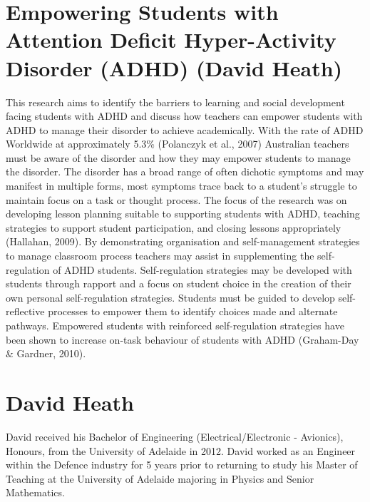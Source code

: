 \documentclass[twoside,12pt,a4paper,notitlepage]{memoir}
\begin{document}
\pagebreak
\section*{Empowering Students with Attention Deficit Hyper-Activity Disorder (ADHD) (David Heath)}
\label{aut:heath}

This research aims to identify the barriers to learning and social development facing students with ADHD and discuss how teachers can empower students with ADHD to manage their disorder to achieve academically.
With the rate of ADHD Worldwide at approximately 5.3\% (Polanczyk et al., 2007) Australian teachers must be aware of the disorder and how they may empower students to manage the disorder. The disorder has a broad range of often dichotic symptoms and may manifest in multiple forms, most symptoms trace back to a student’s struggle to maintain focus on a task or thought process.
The focus of the research was on developing lesson planning suitable to supporting students with ADHD, teaching strategies to support student participation, and closing lessons appropriately (Hallahan, 2009). By demonstrating organisation and self-management strategies to manage classroom process teachers may assist in supplementing the self-regulation of ADHD students. Self-regulation strategies may be developed with students through rapport and a focus on student choice in the creation of their own personal self-regulation strategies. Students must be guided to develop self-reflective processes to empower them to identify choices made and alternate pathways. Empowered students with reinforced self-regulation strategies have been shown to increase on-task behaviour of students with ADHD (Graham-Day \& Gardner, 2010).

\section*{David Heath}

David received his Bachelor of Engineering (Electrical/Electronic - Avionics), Honours, from the University of Adelaide in 2012. David worked as an Engineer within the Defence industry for 5 years prior to returning to study his Master of Teaching at the University of Adelaide majoring in Physics and Senior Mathematics.
\end{document}
